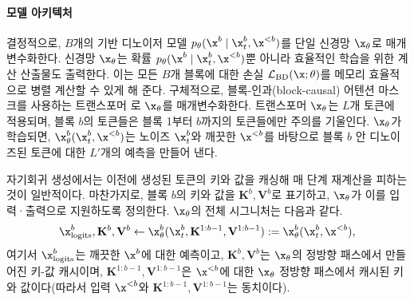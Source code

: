 \documentclass{article} %
\newcommand{\marianne}[1]{\textcolor{brown}{[Marianne: #1]}}
\begin{document}

\paragraph{모델 아키텍처}
결정적으로, $B$개의 기반 디노이저 모델 $p_\theta(\x^b \mid \x^b_t, \x^{<b})$를 단일 신경망 $\x_\theta$로 매개변수화한다. 신경망 $\x_\theta$는 확률 $p_\theta(\x^b \mid \x_t^b, \x^{<b})$뿐 아니라 효율적인 학습을 위한 계산 산출물도 출력한다. 이는 모든 $B$개 블록에 대한 손실 $\mathcal{L}_\text{BD}(\x; \theta)$를 메모리 효율적으로 병렬 계산할 수 있게 해 준다.
구체적으로, 블록-인과(block-causal) 어텐션 마스크를 사용하는 트랜스포머 \citep{vaswani2017attention}로 $\x_\theta$를 매개변수화한다. 트랜스포머 $\x_\theta$는 $L$개 토큰에 적용되며, 블록 $b$의 토큰들은 블록 1부터 $b$까지의 토큰들에만 주의를 기울인다. $\x_\theta$가 학습되면, $\x^b_\theta(\x^b_t, \x^{<b})$는 노이즈 $\x^b_t$와 깨끗한 $\x^{<b}$를 바탕으로 블록 $b$ 안 디노이즈된 토큰에 대한 $L'$개의 예측을 만들어 낸다. %

자기회귀 생성에서는 이전에 생성된 토큰의 키와 값을 캐싱해 매 단계 재계산을 피하는 것이 일반적이다. 마찬가지로, 블록 $b$의 키와 값을 $\mathbf{K}^b, \mathbf{V}^b$로 표기하고, $\x_\theta$가 이를 입력·출력으로 지원하도록 정의한다. $\x_\theta$의 전체 시그니처는 다음과 같다.
\begin{align}\label{eqn:model-kv}
    \x_\text{logits}^b, \mathbf{K}^b, \mathbf{V}^b \gets \x^b_\theta(\x^b_t, \mathbf{K}^{1:b-1}, \mathbf{V}^{1:b-1}) := \x^b_\theta(\x^b_t, \x^{<b}),
\end{align}
여기서 $\x_\text{logits}^b$는 깨끗한 $\x^b$에 대한 예측이고, $\mathbf{K}^b, \mathbf{V}^b$는 $\x_\theta$의 정방향 패스에서 만들어진 키-값 캐시이며, $\mathbf{K}^{1:b-1}, \mathbf{V}^{1:b-1}$은 $\x^{<b}$에 대한 $\x_\theta$ 정방향 패스에서 캐시된 키와 값이다(따라서 입력 $\x^{<b}$와 $\mathbf{K}^{1:b-1}, \mathbf{V}^{1:b-1}$는 동치이다).
\end{document}
